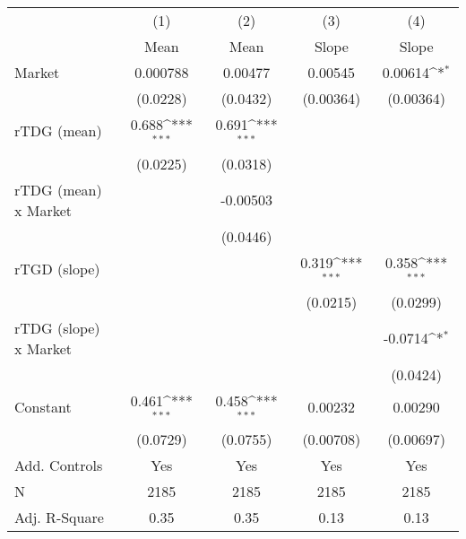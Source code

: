 {
\def\sym#1{\ifmmode^{#1}\else\(^{#1}\)\fi}
\begin{tabular}{l*{4}{c}}
\hline\hline
                    &\multicolumn{1}{c}{(1)}         &\multicolumn{1}{c}{(2)}         &\multicolumn{1}{c}{(3)}         &\multicolumn{1}{c}{(4)}         \\
                    &        Mean         &        Mean         &       Slope         &       Slope         \\
\hline
Market              &    0.000788         &     0.00477         &     0.00545         &     0.00614\sym{*}  \\
                    &    (0.0228)         &    (0.0432)         &   (0.00364)         &   (0.00364)         \\
[1em]
rTDG (mean)         &       0.688\sym{***}&       0.691\sym{***}&                     &                     \\
                    &    (0.0225)         &    (0.0318)         &                     &                     \\
[1em]
rTDG (mean) x Market&                     &    -0.00503         &                     &                     \\
                    &                     &    (0.0446)         &                     &                     \\
[1em]
rTGD (slope)        &                     &                     &       0.319\sym{***}&       0.358\sym{***}\\
                    &                     &                     &    (0.0215)         &    (0.0299)         \\
[1em]
rTDG (slope) x Market&                     &                     &                     &     -0.0714\sym{*}  \\
                    &                     &                     &                     &    (0.0424)         \\
[1em]
Constant            &       0.461\sym{***}&       0.458\sym{***}&     0.00232         &     0.00290         \\
                    &    (0.0729)         &    (0.0755)         &   (0.00708)         &   (0.00697)         \\
[1em]
Add. Controls       &         Yes         &         Yes         &         Yes         &         Yes         \\
\hline
N                   &        2185         &        2185         &        2185         &        2185         \\
Adj. R-Square       &        0.35         &        0.35         &        0.13         &        0.13         \\
\hline\hline
\end{tabular}
}

